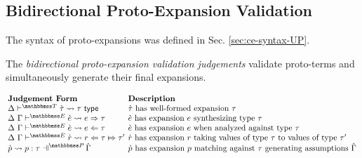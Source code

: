 
\subsection{Bidirectional Proto-Expansion Validation}\label{sec:ce-validation-B}
The syntax of proto-expansions was defined in Sec. \ref{sec:ce-syntax-UP}.

The \emph{bidirectional proto-expansion validation judgements} validate proto-terms and simultaneously generate their final expansions.

\vspace{10px}\noindent$\arraycolsep=2pt\begin{array}{ll}
\textbf{Judgement Form} & \textbf{Description}\\
\cvalidT{\Delta}{\tscenev}{\ctau}{\tau} & \text{$\ctau$ has well-formed expansion $\tau$}\\
\csynX{\ce}{e}{\tau} & \text{$\ce$ has expansion $e$ synthesizing type $\tau$}\\
\canaX{\ce}{e}{\tau} & \text{$\ce$ has expansion $e$ when analyzed against type $\tau$}\\
\crana{\Delta}{\Gamma}{\escenev}{\crv}{r}{\tau}{\tau'} & \text{$\crv$ has expansion $r$ taking values of type $\tau$ to values of type $\tau'$}\\
\cvalidP{\upctx}{\pscenev}{\cpv}{p}{\tau} & \text{$\cpv$ has expansion $p$ matching against $\tau$ generating assumptions $\upctx$}
\end{array}$\vspace{10px}

